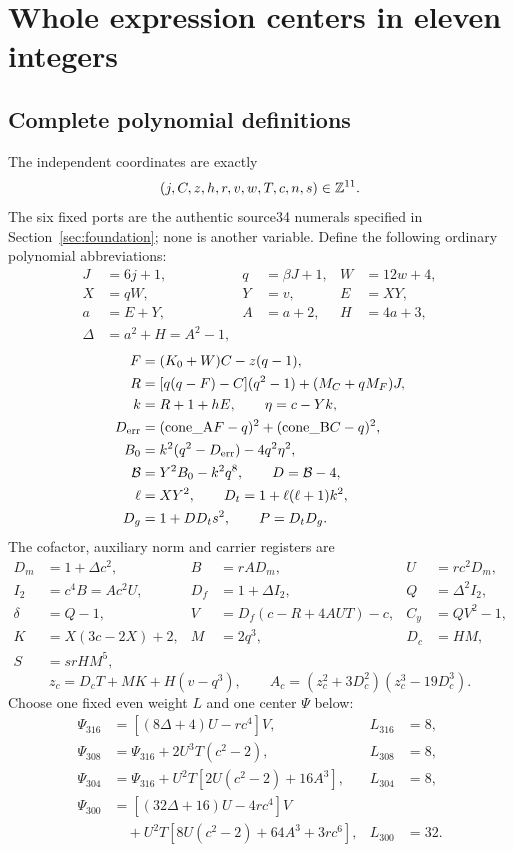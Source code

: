 \section{Whole expression centers in eleven integers}
\label{sec:scalar}
\subsection{Complete polynomial definitions}
The independent coordinates are exactly
\[
 (j,C,z,h,r,v,w,T,c,n,s)\in\mathbb Z^{11}.
\]
The six fixed ports are the authentic source34 numerals specified in
Section~\ref{sec:foundation}; none is another variable. Define the following
ordinary polynomial abbreviations:
\begin{align*}
 J&=6j+1,& q&=\beta J+1,& W&=12w+4,\\
 X&=qW,&Y&=v,&E&=XY,\\
 a&=E+Y,&A&=a+2,&H&=4a+3,\\
 \Delta&=a^2+H=A^2-1,&&&
\end{align*}
\begin{align*}
 F&=(K_0+W)C-z(q-1),\\
 R&=[q(q-F)-C](q^2-1)+(M_C+qM_F)J,\\
 k&=R+1+hE,\qquad \eta=c-Yk,\\
 D_{\rm err}&=(\mathrm{cone\_A}F-q)^2+(\mathrm{cone\_B}C-q)^2,\\
 B_0&=k^2(q^2-D_{\rm err})-4q^2\eta^2,\\
 \mathcal B&=Y^2B_0-k^2q^8,\qquad D=\mathcal B-4,\\
 \ell&=XY^2,\qquad D_t=1+\ell(\ell+1)k^2,\\
 D_g&=1+DD_ts^2,\qquad P=D_tD_g.
\end{align*}
The cofactor, auxiliary norm and carrier registers are
\begin{align*}
 D_m&=1+\Delta c^2,& B&=rAD_m,& U&=rc^2D_m,\\
 I_2&=c^4B=Ac^2U,& D_f&=1+\Delta I_2,& Q&=\Delta^2I_2,\\
 \delta&=Q-1,& V&=D_f(c-R+4AUT)-c,& C_y&=QV^2-1,\\
 K&=X(3c-2X)+2,&M&=2q^3,&D_c&=HM,\\
 S&=srHM^5,&&&
\end{align*}
\[
 z_c=D_cT+MK+H(v-q^3),\qquad
 A_c=(z_c^2+3D_c^2)(z_c^3-19D_c^3).
\]
Choose one fixed even weight $L$ and one center $\Psi$ below:
\begin{align*}
 \Psi_{316}&=[(8\Delta+4)U-rc^4]V,&L_{316}&=8,\\
 \Psi_{308}&=\Psi_{316}+2U^3T(c^2-2),&L_{308}&=8,\\
 \Psi_{304}&=\Psi_{316}+U^2T[2U(c^2-2)+16A^3],&L_{304}&=8,\\
 \Psi_{300}&=[(32\Delta+16)U-4rc^4]V&&\\
 &\quad+U^2T[8U(c^2-2)+64A^3+3rc^6],&L_{300}&=32.
\end{align*}
